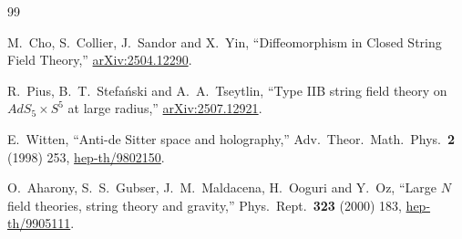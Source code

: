 \documentclass[12pt]{article}
\begin{document}
\begin{thebibliography}{99}

M.~Cho, S.~Collier, J.~Sandor and X.~Yin,
``Diffeomorphism in Closed String Field Theory,''
\href{https://arxiv.org/abs/2504.12290}{arXiv:2504.12290}.

R.~Pius, B.~T.~Stefa\'nski and A.~A.~Tseytlin,
``Type IIB string field theory on $AdS_5\times S^5$ at large radius,''
\href{https://arxiv.org/abs/2507.12921}{arXiv:2507.12921}.

E.~Witten,
``Anti-de Sitter space and holography,''
Adv.\ Theor.\ Math.\ Phys.\ {\bf 2} (1998) 253,
\href{https://arxiv.org/abs/hep-th/9802150}{hep-th/9802150}.

O.~Aharony, S.~S.~Gubser, J.~M.~Maldacena, H.~Ooguri and Y.~Oz,
``Large $N$ field theories, string theory and gravity,''
Phys.\ Rept.\ {\bf 323} (2000) 183,
\href{https://arxiv.org/abs/hep-th/9905111}{hep-th/9905111}.

\end{thebibliography}
\end{document}
